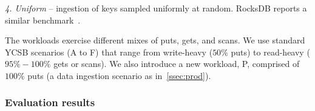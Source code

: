 \documentclass[sigplan,10pt]{acmart}
\begin{document}
\emph{4. Uniform} -- ingestion of keys sampled uniformly at random. RocksDB
reports a similar benchmark~\cite{rocksdb-benchmarks}. %

The workloads exercise different mixes of puts, gets, and scans. We use standard YCSB scenarios 
(A to F) that range from write-heavy ($50\%$ puts) to read-heavy ($95\%-100\%$ gets or scans). 
We also introduce a new workload, P, comprised of $100\%$ puts (a data ingestion scenario
as in~\cref{ssec:prod}).

\subsubsection{Evaluation results}
\end{document}
